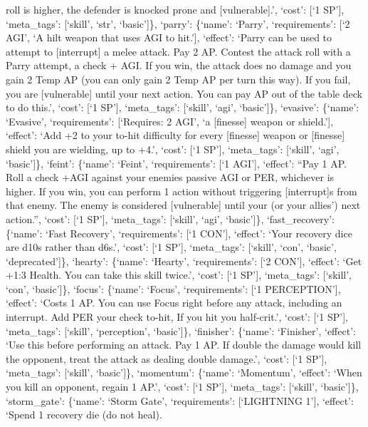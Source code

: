 \documentclass[
  letterpaper,
  DIV=11,
  numbers=noendperiod]{scrartcl}
\begin{document}
roll is higher, the defender is knocked prone and {[}vulnerable{]}.',
`cost': {[}`1 SP'{]}, `meta\_tags': {[}`skill', `str', `basic'{]}\},
`parry': \{`name': `Parry', `requirements': {[}`2 AGI', `A hilt weapon
that uses AGI to hit.'{]}, `effect': `Parry can be used to attempt to
{[}interrupt{]} a melee attack. Pay 2 AP. Contest the attack roll with a
Parry attempt, a check + AGI. If you win, the attack does no damage and
you gain 2 Temp AP (you can only gain 2 Temp AP per turn this way). If
you fail, you are {[}vulnerable{]} until your next action. You can pay
AP out of the table deck to do this.', `cost': {[}`1 SP'{]},
`meta\_tags': {[}`skill', `agi', `basic'{]}\}, `evasive': \{`name':
`Evasive', `requirements': {[}`Requires: 2 AGI', `a {[}finesse{]} weapon
or shield.'{]}, `effect': `Add +2 to your to-hit difficulty for every
{[}finesse{]} weapon or {[}finesse{]} shield you are wielding, up to
+4.', `cost': {[}`1 SP'{]}, `meta\_tags': {[}`skill', `agi',
`basic'{]}\}, `feint': \{`name': `Feint', `requirements': {[}`1 AGI'{]},
`effect': ``Pay 1 AP. Roll a check +AGI against your enemies passive AGI
or PER, whichever is higher. If you win, you can perform 1 action
without triggering {[}interrupt{]}s from that enemy. The enemy is
considered {[}vulnerable{]} until your (or your allies') next action.'',
`cost': {[}`1 SP'{]}, `meta\_tags': {[}`skill', `agi', `basic'{]}\},
`fast\_recovery': \{`name': `Fast Recovery', `requirements': {[}`1
CON'{]}, `effect': `Your recovery dice are d10s rather than d6s.',
`cost': {[}`1 SP'{]}, `meta\_tags': {[}`skill', `con', `basic',
`deprecated'{]}\}, `hearty': \{`name': `Hearty', `requirements': {[}`2
CON'{]}, `effect': `Get +1:3 Health. You can take this skill twice.',
`cost': {[}`1 SP'{]}, `meta\_tags': {[}`skill', `con', `basic'{]}\},
`focus': \{`name': `Focus', `requirements': {[}`1 PERCEPTION'{]},
`effect': `Costs 1 AP. You can use Focus right before any attack,
including an interrupt. Add PER your check to-hit, If you hit you
half-crit.', `cost': {[}`1 SP'{]}, `meta\_tags': {[}`skill',
`perception', `basic'{]}\}, `finisher': \{`name': `Finisher', `effect':
`Use this before performing an attack. Pay 1 AP. If double the damage
would kill the opponent, treat the attack as dealing double damage.',
`cost': {[}`1 SP'{]}, `meta\_tags': {[}`skill', `basic'{]}\},
`momentum': \{`name': `Momentum', `effect': `When you kill an opponent,
regain 1 AP.', `cost': {[}`1 SP'{]}, `meta\_tags': {[}`skill',
`basic'{]}\}, `storm\_gate': \{`name': `Storm Gate', `requirements':
{[}`LIGHTNING 1'{]}, `effect': `Spend 1 recovery die (do not heal).
\end{document}
